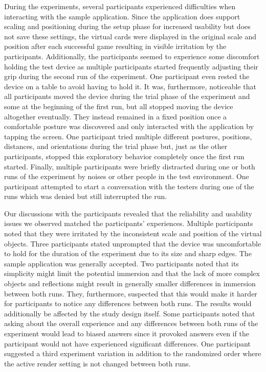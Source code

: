 \documentclass[12pt,twoside,english]{article}
\begin{document}
During the experiments, several participants experienced difficulties when interacting with the sample application.
Since the application does support scaling and positioning during the setup phase for increased usability but does not save these settings, the virtual cards were displayed in the original scale and position after each successful game resulting in visible irritation by the participants.
Additionally, the participants seemed to experience some discomfort holding the test device as multiple participants started frequently adjusting their grip during the second run of the experiment.
One participant even rested the device on a table to avoid having to hold it.
It was, furthermore, noticeable that all participants moved the device during the trial phase of the experiment and some at the beginning of the first run, but all stopped moving the device altogether eventually.
They instead remained in a fixed position once a comfortable posture was discovered and only interacted with the application by tapping the screen.
One participant tried multiple different postures, positions, distances, and orientations during the trial phase but, just as the other participants, stopped this exploratory behavior completely once the first run started.
Finally, multiple participants were briefly distracted during one or both runs of the experiment by noises or other people in the test environment.
One participant attempted to start a conversation with the testers during one of the runs which was denied but still interrupted the run.

Our discussions with the participants revealed that the reliability and usability issues we observed matched the participants' experiences.
Multiple participants noted that they were irritated by the inconsistent scale and position of the virtual objects.
Three participants stated unprompted that the device was uncomfortable to hold for the duration of the experiment due to its size and sharp edges.
The sample application was generally accepted.
Two participants noted that its simplicity might limit the potential immersion and that the lack of more complex objects and reflections might result in generally smaller differences in immersion between both runs.
They, furthermore, suspected that this would make it harder for participants to notice any differences between both runs.
The results would additionally be affected by the study design itself.
Some participants noted that asking about the overall experience and any differences between both runs of the experiment would lead to biased answers since it provoked answers even if the participant would not have experienced significant differences.
One participant suggested a third experiment variation in addition to the randomized order where the active render setting is not changed between both runs.
\end{document}
